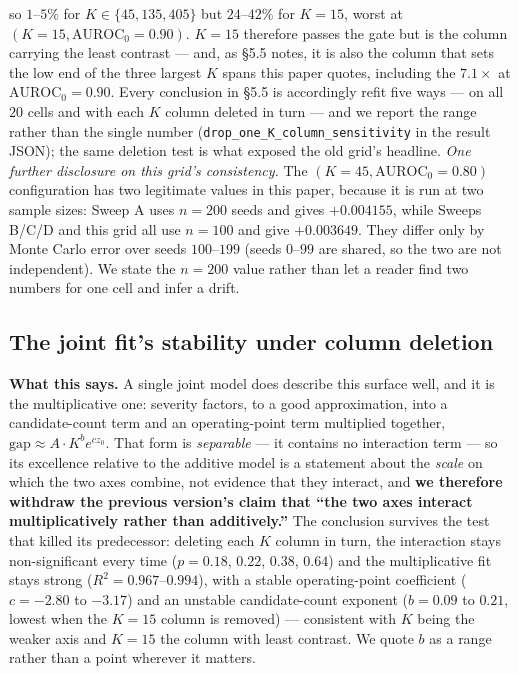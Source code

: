 \documentclass[10pt]{article} %
\begin{document}
\noindent so $1$--$5\%$ for $K\in\{45,135,405\}$ but $24$--$42\%$ for $K=15$,
worst at $(K{=}15,\text{AUROC}_0{=}0.90)$. $K=15$ therefore passes the gate but
is the column carrying the least contrast --- and, as §5.5 notes, it is also
the column that sets the low end of the three largest $K$ spans this paper
quotes, including the $7.1\times$ at $\text{AUROC}_0=0.90$. Every conclusion in §5.5 is accordingly refit five ways --- on all $20$ cells and with each $K$ column deleted in turn
--- and we report the range rather than the single number
(\texttt{drop\_one\_K\_column\_sensitivity} in the result JSON); the same
deletion test is what exposed the old grid's headline. \emph{One further
disclosure on this grid's consistency.} The
$(K{=}45,\text{AUROC}_0{=}0.80)$ configuration has two legitimate values in
this paper, because it is run at two sample sizes: Sweep A uses $n=200$ seeds
and gives $+0.004155$, while Sweeps B/C/D and this grid all use $n=100$ and
give $+0.003649$. They differ only by Monte Carlo error over seeds $100$--$199$
(seeds $0$--$99$ are shared, so the two are not independent). We state the
$n=200$ value rather than let a reader find two numbers for one cell and infer
a drift.

\subsection{The joint fit's stability under column deletion}

\textbf{What this says.} A single joint model does describe this surface well,
and it is the multiplicative one: severity factors, to a good approximation,
into a candidate-count term and an operating-point term multiplied together,
$\text{gap}\approx A\cdot K^{b}e^{cz_0}$. That form is \emph{separable} --- it
contains no interaction term --- so its excellence relative to the additive
model is a statement about the \emph{scale} on which the two axes combine, not
evidence that they interact, and \textbf{we therefore withdraw the previous
version's claim that ``the two axes interact multiplicatively rather than
additively.''} The conclusion survives the test that killed its predecessor:
deleting each $K$ column in turn, the interaction stays non-significant every
time ($p=0.18$, $0.22$, $0.38$, $0.64$) and the multiplicative fit stays strong
($R^2=0.967$--$0.994$), with a stable operating-point coefficient ($c=-2.80$ to
$-3.17$) and an unstable candidate-count exponent ($b=0.09$ to $0.21$, lowest
when the $K=15$ column is removed) --- consistent with $K$ being the weaker
axis and $K=15$ the column with least contrast. We quote $b$ as a range rather
than a point wherever it matters.
\end{document}
